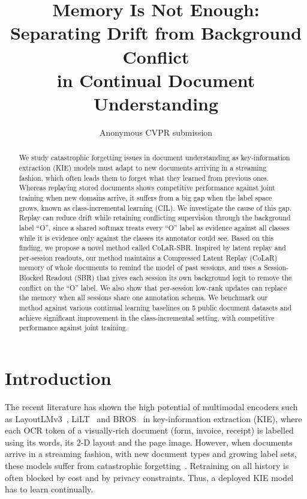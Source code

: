 \documentclass[10pt,twocolumn,letterpaper]{article}
\title{Memory Is Not Enough: Separating Drift from Background Conflict\\in Continual Document Understanding}
\author{Anonymous CVPR submission}
\begin{document}
\maketitle

\begin{abstract}
We study catastrophic forgetting issues in document understanding as key-information extraction (KIE) models must adapt to new documents arriving in a streaming fashion, which often leads them to forget what they learned from previous ones. Whereas replaying stored documents shows competitive performance against joint training when new domains arrive, it suffers from a big gap when the label space grows, known as class-incremental learning (CIL). We investigate the cause of this gap. Replay can reduce drift while retaining conflicting supervision through the background label ``O'', since a shared softmax treats every ``O'' label as evidence against all classes while it is evidence only against the classes its annotator could see. Based on this finding, we propose a novel method called CoLaR-SBR. Inspired by latent replay and per-session readouts, our method maintains a Compressed Latent Replay (CoLaR) memory of whole documents to remind the model of past sessions, and uses a Session-Blocked Readout (SBR) that gives each session its own background logit to remove the conflict on the ``O'' label. We also show that per-session low-rank updates can replace the memory when all sessions share one annotation schema. We benchmark our method against various continual learning baselines on 5 public document datasets and achieve significant improvement in the class-incremental setting, with competitive performance against joint training.
\end{abstract}

\section{Introduction}
\label{sec:intro}

The recent literature has shown the high potential of multimodal encoders such as LayoutLMv3~\citep{huang2022layoutlmv3}, LiLT~\citep{wang2022lilt} and BROS~\citep{hong2022bros} in key-information extraction (KIE), where each OCR token of a visually-rich document (form, invoice, receipt) is labelled using its words, its 2-D layout and the page image. However, when documents arrive in a streaming fashion, with new document types and growing label sets, these models suffer from catastrophic forgetting~\citep{mccloskey1989catastrophic}. Retraining on all history is often blocked by cost and by privacy constraints. Thus, a deployed KIE model has to learn continually.
\end{document}
